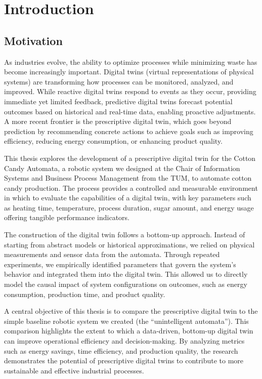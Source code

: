 \chapter{Introduction}
\label{sec:intro}

\section{Motivation}
\label{sec:intro:mo}

As industries evolve, the ability to optimize processes while minimizing waste has become increasingly important. Digital twins (virtual representations of physical systems) are transforming how processes can be monitored, analyzed, and improved. While reactive digital twins respond to events as they occur, providing immediate yet limited feedback, predictive digital twins forecast potential outcomes based on historical and real-time data, enabling proactive adjustments. A more recent frontier is the prescriptive digital twin, which goes beyond prediction by recommending concrete actions to achieve goals such as improving efficiency, reducing energy consumption, or enhancing product quality.

This thesis explores the development of a prescriptive digital twin for the Cotton Candy Automata, a robotic system we designed at the Chair of Information Systems and Business Process Management from the TUM, to automate cotton candy production. The process provides a controlled and measurable environment in which to evaluate the capabilities of a digital twin, with key parameters such as heating time, temperature, process duration, sugar amount, and energy usage offering tangible performance indicators.

The construction of the digital twin follows a bottom-up approach. Instead of starting from abstract models or historical approximations, we relied on physical measurements and sensor data from the automata. Through repeated experiments, we empirically identified parameters that govern the system's behavior and integrated them into the digital twin. This allowed us to directly model the causal impact of system configurations on outcomes, such as energy consumption, production time, and product quality.

A central objective of this thesis is to compare the prescriptive digital twin to the simple baseline robotic system we created (the “unintelligent automata”). This comparison highlights the extent to which a data-driven, bottom-up digital twin can improve operational efficiency and decision-making. By analyzing metrics such as energy savings, time efficiency, and production quality, the research demonstrates the potential of prescriptive digital twins to contribute to more sustainable and effective industrial processes.


